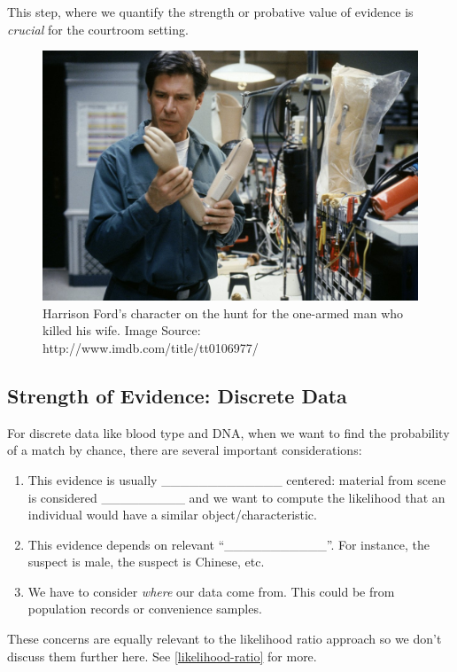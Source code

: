 \documentclass[]{book}
\providecommand{\tightlist}{%
  \setlength{\itemsep}{0pt}\setlength{\parskip}{0pt}}
\theoremstyle{definition}
\theoremstyle{definition}
\theoremstyle{remark}
\begin{document}
This step, where we quantify the strength or probative value of evidence
is \emph{crucial} for the courtroom setting.

\begin{figure}[h]

{\centering \includegraphics[width=.5\linewidth]{img/thefugitive} 

}

\caption{Harrison Ford's character on the hunt for the one-armed man who killed his wife. Image Source: http://www.imdb.com/title/tt0106977/}\label{fig:fugitive}
\end{figure}

\subsection{Strength of Evidence: Discrete
Data}\label{strength-of-evidence-discrete-data}

For discrete data like blood type and DNA, when we want to find the
probability of a match by chance, there are several important
considerations:

\begin{enumerate}
\def\labelenumi{\arabic{enumi}.}
\tightlist
\item
  This evidence is usually \_\_\_\_\_\_\_\_\_\_\_\_\_ centered: material
  from scene is considered \_\_\_\_\_\_\_\_\_ and we want to compute the
  likelihood that an individual would have a similar
  object/characteristic. \vspace{.1in}
\item
  This evidence depends on relevant ``\_\_\_\_\_\_\_\_\_\_\_''. For
  instance, the suspect is male, the suspect is Chinese, etc.
  \vspace{.1in}
\item
  We have to consider \emph{where} our data come from. This could be
  from population records or convenience samples.
\end{enumerate}

These concerns are equally relevant to the likelihood ratio approach so
we don't discuss them further here. See \ref{likelihood-ratio} for more.
\end{document}

